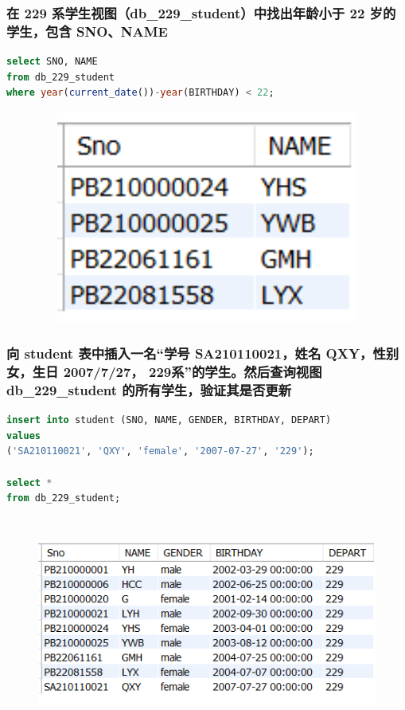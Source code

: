 \documentclass{ctexart}
\begin{document}
\subsubsection{在 229 系学生视图（db\_229\_student）中找出年龄小于 22 岁的学生，包含 SNO、NAME}
\begin{lstlisting}[language=sql]
select SNO, NAME
from db_229_student
where year(current_date())-year(BIRTHDAY) < 22;
\end{lstlisting}
\begin{figure}[H]
	\centering 
	\includegraphics[height=7cm,width=14cm]{48.png}
	\end{figure}
\subsubsection{向 student 表中插入一名“学号 SA210110021，姓名 QXY，性别女，生日 2007/7/27， 229系”的学生。然后查询视图 db\_229\_student 的所有学生，验证其是否更新}
\begin{lstlisting}[language=sql]
insert into student (SNO, NAME, GENDER, BIRTHDAY, DEPART)  
values   
('SA210110021', 'QXY', 'female', '2007-07-27', '229');

select *
from db_229_student;
\end{lstlisting}
\begin{figure}[H]
	\centering 
	\includegraphics[height=7cm,width=14cm]{49.png}
	\end{figure}
\end{document}
